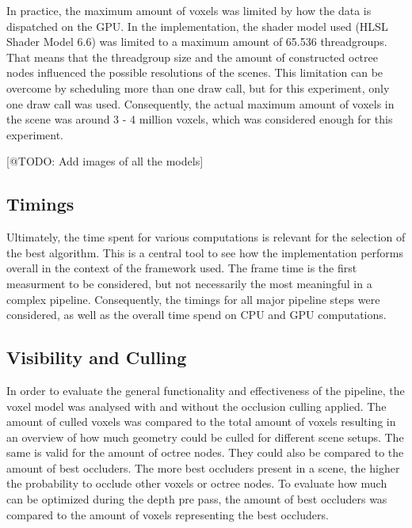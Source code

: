 \noindent
In practice, the maximum amount of voxels was limited by how the data is dispatched on the \ac{GPU}. In the 
implementation, the shader model used (HLSL Shader Model 6.6) was limited to a maximum amount of 65.536 
threadgroups. That means that the threadgroup size and the amount of constructed octree nodes influenced the 
possible resolutions of the scenes. This limitation can be overcome by scheduling more than one draw call, 
but for this experiment, only one draw call was used. Consequently, the actual maximum amount of voxels in the 
scene was around 3 - 4 million voxels, which was considered enough for this experiment.

[@TODO: Add images of all the models]


\subsection*{Timings} \label{subsec-timings}

Ultimately, the time spent for various computations is relevant for the selection of the best algorithm. This is 
a central tool to see how the implementation performs overall in the context of the framework used. The frame 
time is the first measurment to be considered, but not necessarily the most meaningful in a complex pipeline. 
Consequently, the timings for all major pipeline steps were considered, as well as the overall time spend on 
\ac{CPU} and \ac{GPU} computations. 


\subsection*{Visibility and Culling} \label{subsec-visibility-and-culling}

In order to evaluate the general functionality and effectiveness of the pipeline, the voxel model was analysed 
with and without the occlusion culling applied. The amount of culled voxels was compared to the total amount of 
voxels resulting in an overview of how much geometry could be culled for different scene setups. The same is 
valid for the amount of octree nodes. They could also be compared to the amount of best occluders. The more best 
occluders present in a scene, the higher the probability to occlude other voxels or octree nodes. To evaluate 
how much can be optimized during the depth pre pass, the amount of best occluders was compared to the amount 
of voxels representing the best occluders. \\

